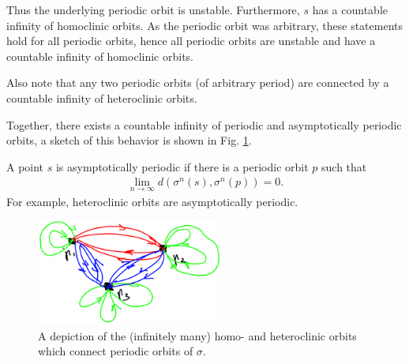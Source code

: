 Thus the underlying periodic orbit is unstable. Furthermore, $s$ has a countable infinity of homoclinic orbits. As the periodic orbit was arbitrary, these statements hold for all periodic orbits, hence all periodic orbits are unstable and have a countable infinity of homoclinic orbits.

\begin{remark}[]
Also note that any two periodic orbits (of arbitrary period) are connected by a countable infinity of heteroclinic orbits.
\end{remark}
Together, there exists a countable infinity of periodic and asymptotically periodic orbits, a sketch of this behavior is shown in Fig. \ref{fig:crazy_orbits}.
\begin{definition}
	A point $s$ is asymptotically periodic if there is a periodic orbit $p$ such that 
	\begin{align}
		\boxed{
			\lim_{n\to \infty } d(\sigma^{n}(s), \sigma^{n}(p))=0.
		}
	\end{align}
For example, heteroclinic orbits are asymptotically periodic.
\end{definition}

\begin{figure}[h!]
	\centering
	\includegraphics[width=0.55\textwidth]{figures/ch6/21crazy_orbits.png}
	\caption{A depiction of the (infinitely many) homo- and heteroclinic orbits which connect periodic orbits of $\sigma $.}
	\label{fig:crazy_orbits}
\end{figure}

